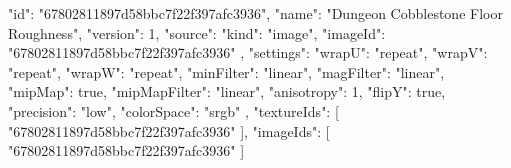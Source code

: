 {
  "id": "67802811897d58bbc7f22f397afc3936",
  "name": "Dungeon Cobblestone Floor Roughness",
  "version": 1,
  "source": {
    "kind": "image",
    "imageId": "67802811897d58bbc7f22f397afc3936"
  },
  "settings": {
    "wrapU": "repeat",
    "wrapV": "repeat",
    "wrapW": "repeat",
    "minFilter": "linear",
    "magFilter": "linear",
    "mipMap": true,
    "mipMapFilter": "linear",
    "anisotropy": 1,
    "flipY": true,
    "precision": "low",
    "colorSpace": "srgb"
  },
  "textureIds": [
    "67802811897d58bbc7f22f397afc3936"
  ],
  "imageIds": [
    "67802811897d58bbc7f22f397afc3936"
  ]
}
